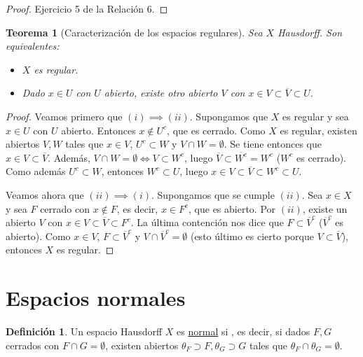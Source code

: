 \documentclass[12pt]{report}
\newtheorem{theorem}{Teorema}[chapter]
\theoremstyle{definition}
\newtheorem{definition}{Definición}[chapter]
\theoremstyle{definition}
\theoremstyle{remark}
\begin{document}
\begin{proof}
Ejercicio 5 de la Relación 6.
\end{proof}

\begin{theorem}[Caracterización de los espacios regulares]
\label{teo4.1.}
Sea $X$ Hausdorff. Son equivalentes:
\begin{itemize}
    \item[(i)] $X$ es regular.
    \item[(ii)] Dado $x \in U$ con $U$ abierto, existe otro abierto $V$ con $x \in V \subset \overline{V} \subset U$.
\end{itemize}
\end{theorem}

\begin{proof}
Veamos primero que $(i) \implies (ii)$. Supongamos que $X$ es regular y sea $x \in U$ con $U$ abierto. Entonces $x \notin U^c$, que es cerrado. Como $X$ es regular, existen abiertos $V,W$ tales que $x \in V$, $U^c \subset W$ y $V \cap W = \emptyset$. Se tiene entonces que $x \in V \subset \overline{V}$. Además, $V \cap W = \emptyset \iff V \subset W^c$, luego $\displaystyle \overline{V} \subset \overline{W^c} = W^c$ ($W^c$ es cerrado). Como además $U^c \subset W$, entonces $W^c \subset U$, luego $x \in V \subset \overline{V} \subset W^c \subset U$.

\vspace{2mm}
Veamos ahora que $(ii) \implies (i)$. Supongamos que se cumple $(ii)$. Sea $x \in X$ y sea $F$ cerrado con $x \notin F$, es decir, $x \in F^c$, que es abierto. Por $(ii)$, existe un abierto $V$ con $x \in V \subset \overline{V} \subset F^c$. La última contención nos dice que $F \subset \overline{V}^c$ ($\overline{V}^c$ es abierto). Como $x \in V$, $F \subset \overline{V}^c$ y $V \cap \overline{V}^c = \emptyset$ (esto último es cierto porque $V \subset \overline{V}$), entonces $X$ es regular.
\end{proof}

\section{Espacios normales}

\begin{definition}
Un espacio Hausdorff $X$ es \underline{normal} si , es decir, si dados $F,G$ cerrados con $F \cap G = \emptyset$, existen abiertos $\theta_F \supset F, \theta_G \supset G$ tales que $\theta_F \cap \theta_G = \emptyset$.
\end{definition}
\end{document}
